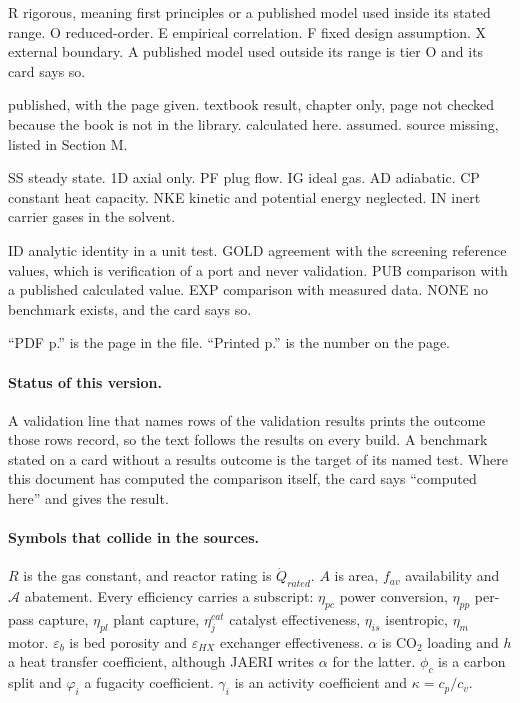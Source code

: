 \begin{description}[leftmargin=1.2cm,itemsep=1pt,topsep=2pt]
\item[Tier] R rigorous, meaning first principles or a published model used inside its stated range. O reduced-order. E empirical correlation. F fixed design assumption. X external boundary. A published model used outside its range is tier O and its card says so.
\item[Evidence] \tagP{} published, with the page given. \tagT{} textbook result, chapter only, page not checked because the book is not in the library. \tagC{} calculated here. \tagA{} assumed.  source missing, listed in Section M.
\item[Assumption codes] SS steady state. 1D axial only. PF plug flow. IG ideal gas. AD adiabatic. CP constant heat capacity. NKE kinetic and potential energy neglected. IN inert carrier gases in the solvent.
\item[Validation codes] ID analytic identity in a unit test. GOLD agreement with the screening reference values, which is verification of a port and never validation. PUB comparison with a published calculated value. EXP comparison with measured data. NONE no benchmark exists, and the card says so.
\item[Page numbers] ``PDF p.'' is the page in the file. ``Printed p.'' is the number on the page.
\end{description}

\paragraph{Status of this version.} \vNumberBasis{} \vTestRun{} \vLinkSummary{} A validation line that names rows of the validation results prints the outcome those rows record, so the text follows the results on every build. A benchmark stated on a card without a results outcome is the target of its named test. Where this document has computed the comparison itself, the card says ``computed here'' and gives the result.

\paragraph{Symbols that collide in the sources.} $R$ is the gas constant, and reactor rating is $\dot Q_{rated}$. $A$ is area, $f_{av}$ availability and $\mathcal A$ abatement. Every efficiency carries a subscript: $\eta_{pc}$ power conversion, $\eta_{pp}$ per-pass capture, $\eta_{pl}$ plant capture, $\eta_j^{cat}$ catalyst effectiveness, $\eta_{is}$ isentropic, $\eta_m$ motor. $\varepsilon_b$ is bed porosity and $\varepsilon_{HX}$ exchanger effectiveness. $\alpha$ is CO$_2$ loading and $h$ a heat transfer coefficient, although JAERI writes $\alpha$ for the latter. $\phi_c$ is a carbon split and $\varphi_i$ a fugacity coefficient. $\gamma_i$ is an activity coefficient and $\kappa=c_p/c_v$.

